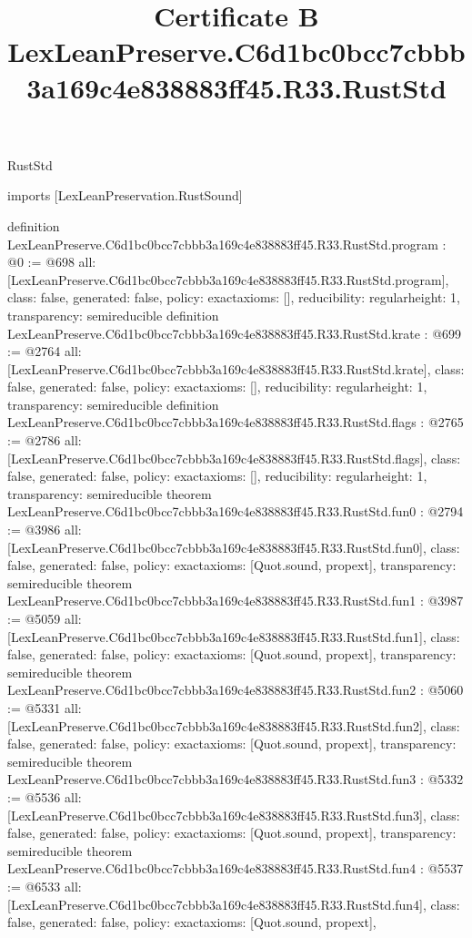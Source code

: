 \begin{lexlean}{RustStd}
\title{Certificate B LexLeanPreserve.C6d1bc0bcc7cbbb3a169c4e838883ff45.R33.RustStd}
\begin{coremodule}
imports [LexLeanPreservation.RustSound]

definition LexLeanPreserve.C6d1bc0bcc7cbbb3a169c4e838883ff45.R33.RustStd.program : @0 := @698 {
  all: [LexLeanPreserve.C6d1bc0bcc7cbbb3a169c4e838883ff45.R33.RustStd.program],
  class: false,
  generated: false,
  policy: exact{axioms: []},
  reducibility: regular{height: 1},
  transparency: semireducible
}
definition LexLeanPreserve.C6d1bc0bcc7cbbb3a169c4e838883ff45.R33.RustStd.krate : @699 := @2764 {
  all: [LexLeanPreserve.C6d1bc0bcc7cbbb3a169c4e838883ff45.R33.RustStd.krate],
  class: false,
  generated: false,
  policy: exact{axioms: []},
  reducibility: regular{height: 1},
  transparency: semireducible
}
definition LexLeanPreserve.C6d1bc0bcc7cbbb3a169c4e838883ff45.R33.RustStd.flags : @2765 := @2786 {
  all: [LexLeanPreserve.C6d1bc0bcc7cbbb3a169c4e838883ff45.R33.RustStd.flags],
  class: false,
  generated: false,
  policy: exact{axioms: []},
  reducibility: regular{height: 1},
  transparency: semireducible
}
theorem LexLeanPreserve.C6d1bc0bcc7cbbb3a169c4e838883ff45.R33.RustStd.fun0 : @2794 := @3986 {
  all: [LexLeanPreserve.C6d1bc0bcc7cbbb3a169c4e838883ff45.R33.RustStd.fun0],
  class: false,
  generated: false,
  policy: exact{axioms: [Quot.sound, propext]},
  transparency: semireducible
}
theorem LexLeanPreserve.C6d1bc0bcc7cbbb3a169c4e838883ff45.R33.RustStd.fun1 : @3987 := @5059 {
  all: [LexLeanPreserve.C6d1bc0bcc7cbbb3a169c4e838883ff45.R33.RustStd.fun1],
  class: false,
  generated: false,
  policy: exact{axioms: [Quot.sound, propext]},
  transparency: semireducible
}
theorem LexLeanPreserve.C6d1bc0bcc7cbbb3a169c4e838883ff45.R33.RustStd.fun2 : @5060 := @5331 {
  all: [LexLeanPreserve.C6d1bc0bcc7cbbb3a169c4e838883ff45.R33.RustStd.fun2],
  class: false,
  generated: false,
  policy: exact{axioms: [Quot.sound, propext]},
  transparency: semireducible
}
theorem LexLeanPreserve.C6d1bc0bcc7cbbb3a169c4e838883ff45.R33.RustStd.fun3 : @5332 := @5536 {
  all: [LexLeanPreserve.C6d1bc0bcc7cbbb3a169c4e838883ff45.R33.RustStd.fun3],
  class: false,
  generated: false,
  policy: exact{axioms: [Quot.sound, propext]},
  transparency: semireducible
}
theorem LexLeanPreserve.C6d1bc0bcc7cbbb3a169c4e838883ff45.R33.RustStd.fun4 : @5537 := @6533 {
  all: [LexLeanPreserve.C6d1bc0bcc7cbbb3a169c4e838883ff45.R33.RustStd.fun4],
  class: false,
  generated: false,
  policy: exact{axioms: [Quot.sound, propext]},
}
\end{coremodule}
\end{lexlean}
